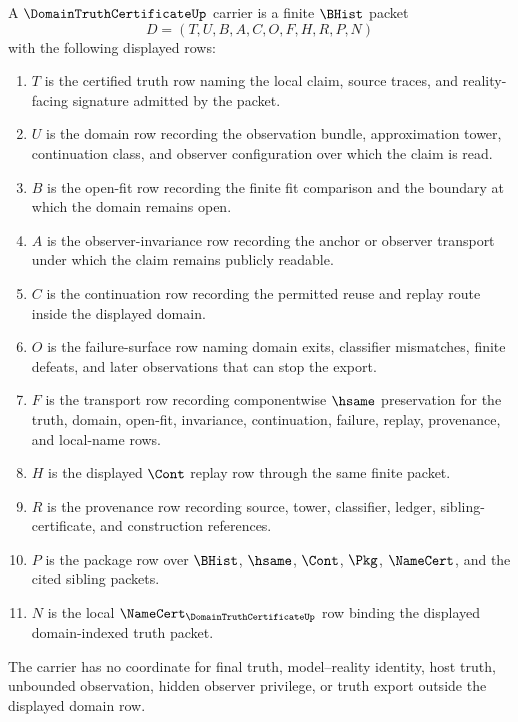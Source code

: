 \begin{definition}
\label{def:domain-truth-certificate-carrier}
A $\DomainTruthCertificateUp$ carrier is a finite $\BHist$ packet
$$
D=(T,U,B,A,C,O,F,H,R,P,N)
$$
with the following displayed rows:
\begin{enumerate}
\item $T$ is the certified truth row naming the local claim, source traces, and reality-facing signature admitted by the packet.
\item $U$ is the domain row recording the observation bundle, approximation tower, continuation class, and observer configuration over which the claim is read.
\item $B$ is the open-fit row recording the finite fit comparison and the boundary at which the domain remains open.
\item $A$ is the observer-invariance row recording the anchor or observer transport under which the claim remains publicly readable.
\item $C$ is the continuation row recording the permitted reuse and replay route inside the displayed domain.
\item $O$ is the failure-surface row naming domain exits, classifier mismatches, finite defeats, and later observations that can stop the export.
\item $F$ is the transport row recording componentwise $\hsame$ preservation for the truth, domain, open-fit, invariance, continuation, failure, replay, provenance, and local-name rows.
\item $H$ is the displayed $\Cont$ replay row through the same finite packet.
\item $R$ is the provenance row recording source, tower, classifier, ledger, sibling-certificate, and construction references.
\item $P$ is the package row over $\BHist$, $\hsame$, $\Cont$, $\Pkg$, $\NameCert$, and the cited sibling packets.
\item $N$ is the local $\NameCert_{\DomainTruthCertificateUp}$ row binding the displayed domain-indexed truth packet.
\end{enumerate}
The carrier has no coordinate for final truth, model--reality identity, host truth, unbounded observation, hidden observer privilege, or truth export outside the displayed domain row.
\end{definition}

